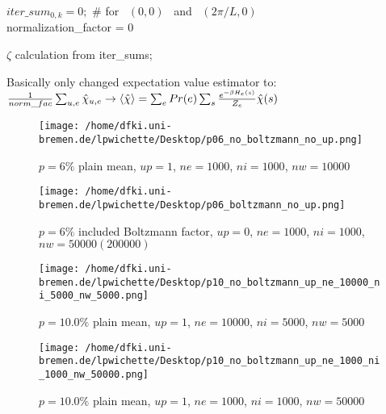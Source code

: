 \documentclass{article}
\begin{document}
\begin{algorithm}

$iter\_sum_{0, k} = 0;$ \qquad \# for~ $(0, 0)$ ~and~ $(2\pi/L, 0)$\\
normalization\_factor = 0\;

$\zeta$ calculation from iter\_sums;\

\end{algorithm}


Basically only changed expectation value estimator to:
$\frac{1}{norm\_fac}\sum_{u, e}\hat{\chi}_{u, e} \rightarrow \braket{\hat{\chi}}=\sum_{e}Pr(e)\sum_{s}\frac{e^{-\beta H_{e}(s)}}{Z_{e}}\hat{\chi}(s)$

\begin{figure}[h!]

  \begin{minipage}{0.5\linewidth}
    \centering
    \texttt{[image: /home/dfki.uni-bremen.de/lpwichette/Desktop/p06\_no\_boltzmann\_no\_up.png]}
    \caption{$p=6\%$ plain mean, $up=1$, $ne=1000$, $ni=1000$, $nw=10000$}
  \end{minipage}%
  \begin{minipage}{0.5\linewidth}
    \centering
    \texttt{[image: /home/dfki.uni-bremen.de/lpwichette/Desktop/p06\_boltzmann\_no\_up.png]}
    \caption{$p=6\%$ included Boltzmann factor, $up=0$, $ne=1000$, $ni=1000$, $nw=50000(200000)$}
  \end{minipage}

\end{figure}

\begin{figure}[h!]
  \begin{minipage}{0.5\textwidth}
    \centering
    \texttt{[image: /home/dfki.uni-bremen.de/lpwichette/Desktop/p10\_no\_boltzmann\_up\_ne\_10000\_ni\_5000\_nw\_5000.png]}
    \caption{$p=10.0\%$ plain mean, $up=1$, $ne=10000$, $ni=5000$, $nw=5000$}
  \end{minipage}%
  \begin{minipage}{0.5\textwidth}
    \centering
    \texttt{[image: /home/dfki.uni-bremen.de/lpwichette/Desktop/p10\_no\_boltzmann\_up\_ne\_1000\_ni\_1000\_nw\_50000.png]}
    \caption{$p=10.0\%$ plain mean, $up=1$, $ne=1000$, $ni=1000$, $nw=50000$}
  \end{minipage}
\end{figure}
\end{document}
